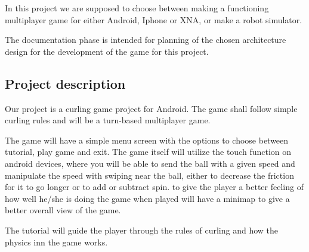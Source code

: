 In this project we are supposed to choose between making a functioning multiplayer game for either Android, Iphone or XNA, or make a robot simulator. 

The documentation phase is intended for planning of the chosen architecture design for the development of the game for this project.

\subsection{Project description} 
Our project is a curling game project for Android. The game shall follow simple curling rules and will be a turn-based multiplayer game.

The game will have a simple menu screen with the options to choose between tutorial, play game and exit. The game itself will utilize the touch function on android devices, where you will be able to send the ball with a given speed and manipulate the speed with swiping near the ball, either to decrease the friction for it to go longer or to add or subtract spin. to give the player a better feeling of how well he/she is doing the game when played will have a minimap to give a better overall view of the game. 

The tutorial will guide the player through the rules of curling and how the physics inn the game works.